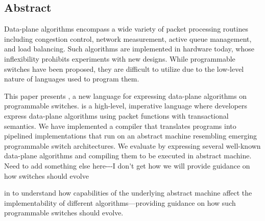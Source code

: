 \subsection*{Abstract}

Data-plane algorithms encompass a wide variety of packet processing routines
including congestion control, network measurement, active queue management, and
load balancing. Such algorithms are implemented in hardware today, whose
inflexibility prohibits experiments with new designs. While programmable
switches have been proposed, they are difficult to
utilize due to the low-level nature of languages used to program them.

This paper presents \pktlanguage, a new language for expressing data-plane
algorithms on programmable switches. \pktlanguage is a high-level, imperative
language where developers express data-plane algorithms using packet functions
with transactional semantics. We have implemented a compiler that translates
\pktlanguage programs into pipelined implementations that run on an abstract
machine resembling emerging programmable switch architectures. We evaluate 
\pktlanguage by expressing several well-known data-plane algorithms and 
compiling them to be executed in abstract machine. \ac{Need to add 
something else here---I don't get how we will provide guidance on how 
switches should evolve}

in \pktlanguage to understand how capabilities of
the underlying abstract machine affect the implementability of different
algorithms---providing guidance on how such programmable switches should
evolve.
\fi
